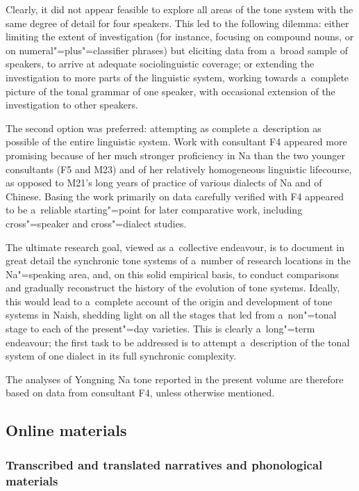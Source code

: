 Clearly, it did not appear feasible to explore all areas of the tone system with the same degree of
detail for four speakers. This led to the following dilemma: either limiting the extent of
investigation (for instance, focusing on compound nouns, or on numeral"=plus"=classifier phrases)
but eliciting data from a~broad sample of speakers, to arrive at adequate sociolinguistic coverage;
or extending the investigation to more parts of the linguistic system, working towards a~complete
picture of the tonal grammar of one speaker, with occasional extension of
the investigation to other speakers.

The second option was preferred: attempting as complete a~description as possible of the entire
linguistic system. Work with consultant F4 appeared more promising because of her much stronger
proficiency in Na than the two younger consultants (F5 and M23) and of her relatively homogeneous
linguistic lifecourse, as opposed to M21’s long years of practice of various dialects of Na and of
Chinese. Basing the work primarily on data carefully verified with F4 appeared to be a~reliable
starting"=point for later comparative work, including cross"=speaker and cross"=dialect studies. 

The ultimate research goal, viewed as a~collective endeavour, is to document in great
detail the synchronic tone systems of a~number of research locations in the Na"=speaking area, and, on
this solid empirical basis, to conduct comparisons and gradually reconstruct the history of the
evolution of tone systems. Ideally, this would lead to a~complete account of the origin and
development of tone systems in {Naish}, shedding light on all the stages that led from a~non"=tonal
stage to each of the present"=day varieties. This is clearly a~long"=term endeavour; the first task to
be addressed is to attempt a~description of the tonal system of one dialect in its full synchronic
complexity.

The analyses of Yongning Na tone reported in the present volume are therefore based on data from
consultant F4, unless otherwise mentioned.


\subsection{Online materials}
\label{sec:onlinematerials}


\subsubsection{Transcribed and translated narratives and phonological materials}
\label{sec:transcribedandtranslatednarrativesandphonologicalmaterials}

